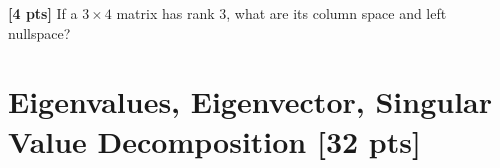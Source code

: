 \documentclass[11pt,addpoints,answers]{exam}
\numberwithin{equation}{section} %
\numberwithin{figure}{section} %
\numberwithin{table}{section} %
\begin{document}
\begin{questions}
    \begin{tcolorbox}[fit,height=5cm, width=\textwidth, blank, borderline={0.5pt}{-2pt},halign=center, valign=center, nobeforeafter]
    \end{tcolorbox}


\question \textbf{[4 pts]} If a $3{\times}4$ matrix has rank $3$, what are its column space and left nullspace?

    \begin{tcolorbox}[fit,height=3cm, width=\textwidth, blank, borderline={0.5pt}{-2pt},halign=center, valign=center, nobeforeafter]
    \end{tcolorbox}


\end{questions}
\clearpage
\section{Eigenvalues, Eigenvector, Singular Value Decomposition [32 pts]}
\end{document}
